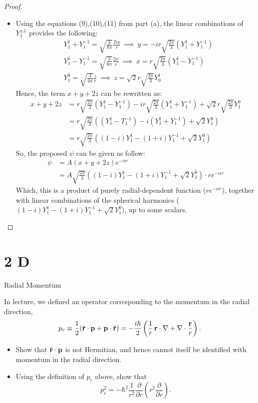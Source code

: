 \documentclass{article}
\begin{document}
\begin{proof}
\begin{itemize}
        \hfil

        \item[(b)] Using the equations (9),(10),(11) from part (a), the linear combinations of $Y_1^{\pm 1}$ provides the following:
        \begin{align}
            &Y_1^1 + Y_1^{-1} = \sqrt{\frac{3}{8\pi}}\frac{2iy}{r}\ \implies\ y = -ir\sqrt{\frac{2\pi}{3}}\left(Y_1^1+Y_1^{-1}\right)\\
            &Y^1_1 - Y_1^{-1} = \sqrt{\frac{3}{8\pi}}\frac{2x}{r}\ \implies \ x = r\sqrt{\frac{2\pi}{3}}\left(Y_1^1-Y_1^{-1}\right)\\
            &Y_1^0 = \sqrt{\frac{3}{4\pi}}\frac{z}{r}\ \implies\ z = \sqrt{2}r\sqrt{\frac{2\pi}{3}}Y_0^1
        \end{align}
        Hence, the term $x+y+2z$ can be rewritten as:
        \begin{align}
            x+y+2z &= r\sqrt{\frac{2\pi}{3}}(Y_1^1-Y_1^{-1})-ir\sqrt{\frac{2\pi}{3}}(Y_1^1+Y_1^{-1}) + \sqrt{2}r\sqrt{\frac{2\pi}{3}}Y_1^0\\
            &= r\sqrt{\frac{2\pi}{3}}((Y_1^1-T_1^{-1})-i(Y_1^1+Y_1^{-1})+\sqrt{2}Y_1^0)\\
            &= r\sqrt{\frac{2\pi}{3}}((1-i)Y_1^1 - (1+i)Y_1^{-1} + \sqrt{2}Y_1^0)
        \end{align}
        So, the proposed $\psi$ can be given as follow:
        \begin{align}
            \psi &= A(x+y+2z)e^{-\alpha r}\\
            &= A\sqrt{\frac{2\pi}{3}}((1-i)Y_1^1 - (1+i)Y_1^{-1}+\sqrt{2}Y_1^0)\cdot re^{-\alpha r}
        \end{align}
        Which, this is a product of purely radial-dependent function ($re^{-\alpha r}$), together with linear combinations of the spherical harmonics ($(1-i)Y_1^1 - (1+i)Y_1^{-1}+\sqrt{2}Y_1^0$), up to some scalars.
    \end{itemize}
\end{proof}

\newpage

\section*{2 D}
\begin{ques}\label{q2}
Radial Momentum

In lecture, we defined an operator corresponding to the momentum in the radial direction,
\[
p_r \equiv \frac{1}{2}(\hat{\mathbf{r}}\cdot \mathbf{p} + \mathbf{p}\cdot \hat{\mathbf{r}})
= -\frac{i\hbar}{2}\left(\frac{1}{r}\, \mathbf{r}\cdot\nabla + \nabla\cdot\frac{\mathbf{r}}{r}\right).
\]

\begin{itemize}
\item[(a)] Show that $\hat{\mathbf{r}}\cdot \mathbf{p}$ is not Hermitian, and hence cannot itself be identified with
momentum in the radial direction.

\item[(b)] Using the definition of $p_r$ above, show that
\[
p_r^2 = -\hbar^2 \frac{1}{r^2}\frac{\partial}{\partial r}
\left(r^2\frac{\partial}{\partial r}\right).
\]
\end{itemize}
\end{ques}
\end{document}
